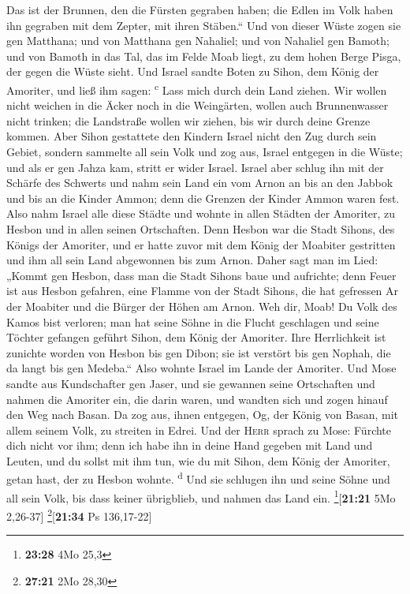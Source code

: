 Das ist der Brunnen, den die Fürsten gegraben haben; die Edlen im Volk
haben ihn gegraben mit dem Zepter, mit ihren Stäben.`` Und von dieser
Wüste zogen sie gen Matthana;  und von Matthana gen
Nahaliel; und von Nahaliel gen Bamoth;  und von Bamoth in
das Tal, das im Felde Moab liegt, zu dem hohen Berge Pisga, der gegen
die Wüste sieht.  Und Israel sandte Boten zu Sihon, dem
König der Amoriter, und ließ ihm sagen: \textsuperscript{c}
 Lass mich durch dein Land ziehen. Wir wollen nicht
weichen in die Äcker noch in die Weingärten, wollen auch Brunnenwasser
nicht trinken; die Landstraße wollen wir ziehen, bis wir durch deine
Grenze kommen.  Aber Sihon gestattete den Kindern Israel
nicht den Zug durch sein Gebiet, sondern sammelte all sein Volk und zog
aus, Israel entgegen in die Wüste; und als er gen Jahza kam, stritt er
wider Israel.  Israel aber schlug ihn mit der Schärfe des
Schwerts und nahm sein Land ein vom Arnon an bis an den Jabbok und bis
an die Kinder Ammon; denn die Grenzen der Kinder Ammon waren fest.
 Also nahm Israel alle diese Städte und wohnte in allen
Städten der Amoriter, zu Hesbon und in allen seinen Ortschaften.
 Denn Hesbon war die Stadt Sihons, des Königs der
Amoriter, und er hatte zuvor mit dem König der Moabiter gestritten und
ihm all sein Land abgewonnen bis zum Arnon.  Daher sagt
man im Lied: „Kommt gen Hesbon, dass man die Stadt Sihons baue und
aufrichte;  denn Feuer ist aus Hesbon gefahren, eine
Flamme von der Stadt Sihons, die hat gefressen Ar der Moabiter und die
Bürger der Höhen am Arnon.  Weh dir, Moab! Du Volk des
Kamos bist verloren; man hat seine Söhne in die Flucht geschlagen und
seine Töchter gefangen geführt Sihon, dem König der Amoriter.
 Ihre Herrlichkeit ist zunichte worden von Hesbon bis gen
Dibon; sie ist verstört bis gen Nophah, die da langt bis gen Medeba.``
 Also wohnte Israel im Lande der Amoriter.
 Und Mose sandte aus Kundschafter gen Jaser, und sie
gewannen seine Ortschaften und nahmen die Amoriter ein, die darin waren,
 und wandten sich und zogen hinauf den Weg nach Basan. Da
zog aus, ihnen entgegen, Og, der König von Basan, mit allem seinem Volk,
zu streiten in Edrei.  Und der \textsc{Herr} sprach zu
Mose: Fürchte dich nicht vor ihm; denn ich habe ihn in deine Hand
gegeben mit Land und Leuten, und du sollst mit ihm tun, wie du mit
Sihon, dem König der Amoriter, getan hast, der zu Hesbon wohnte.
\textsuperscript{d}  Und sie schlugen ihn und seine Söhne
und all sein Volk, bis dass keiner übrigblieb, und nahmen das Land ein.
\footnote{\textbf{23:28} 4Mo 25,3}{[}\textbf{21:21} 5Mo 2,26-37{]}
\footnote{\textbf{27:21} 2Mo 28,30}{[}\textbf{21:34} Ps 136,17-22{]}

